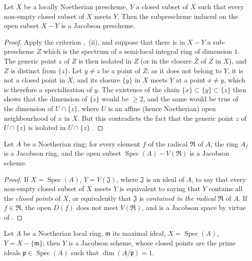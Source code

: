 \begin{proposition}[10.5.7]
\label{IV.10.5.7}
Let $X$ be a locally Noetherian prescheme, $Y$ a closed subset of $X$ such that every non-empty closed subset of $X$ meets $Y$.
Then the subprescheme induced on the open subset $X-Y$ is a Jacobson prescheme.
\end{proposition}

\begin{proof}
Apply the criterion ,~(ii), and suppose that there is in $X-Y$ a sub-prescheme $Z$ which is the spectrum of a semi-local integral ring of dimension $1$. The generic point $z$ of $Z$ is then isolated in $Z$ (or in the closure $\overline{Z}$ of $Z$ in $X$), and $Z$ is distinct from $\{z\}$.
Let $y\neq z$ be a point of $Z$; as it does not belong to $Y$, it is not a closed point in $X$, and its closure $\overline{\{y\}}$ in $X$ meets $Y$ at a point $x\neq y$, which is therefore a specialisation of $y$.
The existence of the chain $\{x\}\subset\overline{\{y\}}\subset\overline{\{z\}}$ then shows that the dimension of $\overline{\{z\}}$ would be $\geq 2$, and the same would be true of the dimension of $U\cap\overline{\{z\}}$, where $U$ is an affine (hence Noetherian) open neighbourhood of $x$ in $X$.
But this contradicts the fact that the generic point $z$ of $U\cap\overline{\{z\}}$ is isolated in $U\cap\overline{\{z\}}$ .
\end{proof}

\begin{corollary}[10.5.8]
\label{IV.10.5.8}
Let $A$ be a Noetherian ring; for every element $f$ of the radical $\mathfrak{R}$ of $A$, the ring $A_f$ is a Jacobson ring, and the open subset $\operatorname{Spec}(A)-V(\mathfrak{R})$ is a Jacobson scheme.
\end{corollary}

\begin{proof}
If $X=\operatorname{Spec}(A)$, $Y=V(\mathfrak{J})$, where $\mathfrak{J}$ is an ideal of $A$, to say that every non-empty closed subset of $X$ meets $Y$ is equivalent  to saying that $Y$ contains all the \emph{closed points} of $X$, or equivalently that $\mathfrak{J}$ is \emph{contained in the radical} $\mathfrak{R}$ of $A$.
If $f\in\mathfrak{R}$, the open $D(f)$ does not meet $V(\mathfrak{R})$, and is a Jacobson space by virtue of .
\end{proof}

\begin{corollary}[10.5.9]
\label{IV.10.5.9}
Let $A$ be a Noetherian local ring, $\mathfrak{m}$ its maximal ideal, $X=\operatorname{Spec}(A)$, $Y=X-\{\mathfrak{m}\}$; then $Y$ is a Jacobson scheme, whose closed points are the prime ideals $\mathfrak{p}\in\operatorname{Spec}(A)$ such that $\dim(A/\mathfrak{p})=1$.
\end{corollary}

